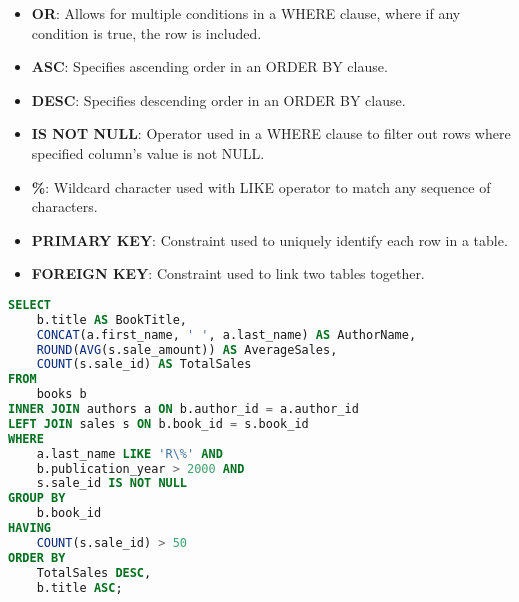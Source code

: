 \begin{itemize}[noitemsep,leftmargin=*]
    \item[]{\textbf{OR}: Allows for multiple conditions in a WHERE clause, where if any condition is true, the row is included.}
    \item[]{\textbf{ASC}: Specifies ascending order in an ORDER BY clause.}
    \item[]{\textbf{DESC}: Specifies descending order in an ORDER BY clause.}
    \item[]{\textbf{IS NOT NULL}: Operator used in a WHERE clause to filter out rows where specified column's value is not NULL.}
    \item[]{\textbf{\%}: Wildcard character used with LIKE operator to match any sequence of characters.}
    \item[]{\textbf{PRIMARY KEY}: Constraint used to uniquely identify each row in a table.}
    \item[]{\textbf{FOREIGN KEY}: Constraint used to link two tables together.}
\end{itemize}

\begin{lstlisting}[language=SQL]
SELECT
    b.title AS BookTitle,
    CONCAT(a.first_name, ' ', a.last_name) AS AuthorName,
    ROUND(AVG(s.sale_amount)) AS AverageSales,
    COUNT(s.sale_id) AS TotalSales
FROM
    books b
INNER JOIN authors a ON b.author_id = a.author_id
LEFT JOIN sales s ON b.book_id = s.book_id
WHERE
    a.last_name LIKE 'R\%' AND
    b.publication_year > 2000 AND
    s.sale_id IS NOT NULL
GROUP BY
    b.book_id
HAVING
    COUNT(s.sale_id) > 50
ORDER BY
    TotalSales DESC,
    b.title ASC;
\end{lstlisting}

